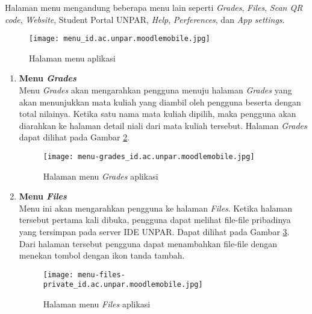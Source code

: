 Halaman menu mengandung beberapa menu lain seperti \textit{Grades}, \textit{Files}, \textit{Scan QR code}, \textit{Website}, Student Portal UNPAR, \textit{Help}, \textit{Perferences}, dan \textit{App settings}.

\begin{figure}[H] 
	\centering  
	\texttt{[image: menu\_id.ac.unpar.moodlemobile.jpg]}  
	\caption[Halaman menu aplikasi] {Halaman menu aplikasi} 
	\label{app:menu} 
\end{figure}  

\begin{enumerate}
\item \textbf{Menu \textit{Grades}} \\
Menu \textit{Grades} akan mengarahkan pengguna menuju halaman \textit{Grades} yang akan menunjukkan mata kuliah yang diambil oleh pengguna beserta dengan total nilainya. Ketika satu nama mata kuliah dipilih, maka pengguna akan diarahkan ke halaman detail niali dari mata kuliah tersebut. Halaman \textit{Grades} dapat dilihat pada Gambar \ref{app:menu:grades}.

\begin{figure}[H] 
	\centering  
	\texttt{[image: menu-grades\_id.ac.unpar.moodlemobile.jpg]}  
	\caption[Halaman menu \textit{Grades} aplikasi] {Halaman menu \textit{Grades} aplikasi} 
	\label{app:menu:grades} 
\end{figure}  

\item \textbf{Menu \textit{Files}} \\

Menu ini akan mengarahkan pengguna ke halaman \textit{Files}. Ketika halaman tersebut pertama kali dibuka, pengguna dapat melihat file-file pribadinya yang tersimpan pada server IDE UNPAR. Dapat dilihat pada Gambar \ref{app:menu:files:private}. Dari halaman tersebut pengguna dapat menambahkan file-file dengan menekan tombol dengan ikon tanda tambah.


\begin{figure}[H] 
	\centering  
	\texttt{[image: menu-files-private\_id.ac.unpar.moodlemobile.jpg]}  
	\caption[Halaman menu \textit{Files} aplikasi] {Halaman menu \textit{Files} aplikasi} 
	\label{app:menu:files:private} 
\end{figure}  


\end{enumerate}

